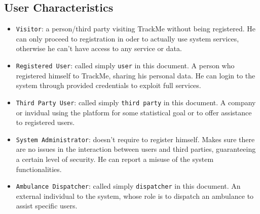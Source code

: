 \documentclass[12pt,a4paper]{article}
\begin{document}
		\newpage
		\subsection{User Characteristics}
		\begin{itemize}
			\item \texttt{Visitor}: a person/third party visiting TrackMe without being registered. He can only proceed to registration in oder to actually use system services, otherwise he can't have access to any service or data.
			\item \texttt{Registered User}: called simply \texttt{user} in this document. A person who registered himself to TrackMe, sharing his personal data. He can login to the system through provided credentials to exploit full services.
			\item \texttt{Third Party User}: called simply \texttt{third party} in this document. A company or invidual using the platform for some statistical goal or to offer assistance to registered users.
			\item \texttt{System Administrator}: doesn't require to register himself. Makes sure there are no issues in the interaction between users and third parties, guaranteeing a certain level of security. He can report a misuse of the system functionalities.
			\item \texttt{Ambulance Dispatcher}: called simply \texttt{dispatcher} in this document. An external individual to the system, whose role is to dispatch an ambulance to assist specific users.
		\end{itemize}

\end{document}
